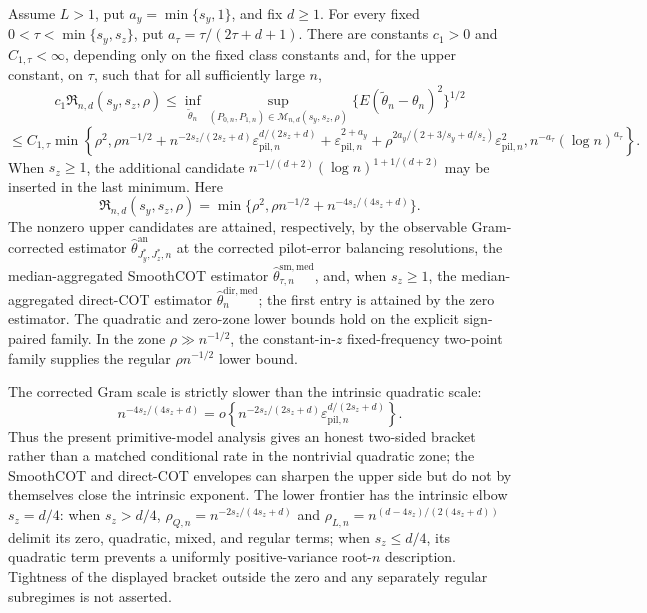 Assume \(L>1\), put \(a_y=\min\{s_y,1\}\), and fix \(d\ge1\). For every fixed \(0<\tau<\min\{s_y,s_z\}\), put \(a_\tau=\tau/(2\tau+d+1)\). There are constants \(c_1>0\) and \(C_{1,\tau}<\infty\), depending only on the fixed class constants and, for the upper constant, on \(\tau\), such that for all sufficiently large \(n\),
\[
c_1\mathfrak R_{n,d}(s_y,s_z,\rho)\le\inf_{\widetilde\theta_n}\sup_{(P_{0,n},P_{1,n})\in\mathcal M_{n,d}(s_y,s_z,\rho)}\{E(\widetilde\theta_n-\theta_n)^2\}^{1/2}
\]
\[
\le C_{1,\tau}\min\!\left\{
\rho^2,
\rho n^{-1/2}
+n^{-2s_z/(2s_z+d)}\varepsilon_{\mathrm{pil},n}^{d/(2s_z+d)}
+\varepsilon_{\mathrm{pil},n}^{2+a_y}
+\rho^{2a_y/(2+3/s_y+d/s_z)}\varepsilon_{\mathrm{pil},n}^2,
n^{-a_\tau}(\log n)^{a_\tau}
\right\}.
\]
When \(s_z\ge1\), the additional candidate \(n^{-1/(d+2)}(\log n)^{1+1/(d+2)}\) may be inserted in the last minimum. Here
\[
\mathfrak R_{n,d}(s_y,s_z,\rho)=\min\{\rho^2,\rho n^{-1/2}+n^{-4s_z/(4s_z+d)}\}.
\]
The nonzero upper candidates are attained, respectively, by the observable Gram-corrected estimator \(\widehat\theta^{\mathrm{an}}_{J_y^*,J_z^*,n}\) at the corrected pilot-error balancing resolutions, the median-aggregated SmoothCOT estimator \(\widehat\theta^{\mathrm{sm,med}}_{\tau,n}\), and, when \(s_z\ge1\), the median-aggregated direct-COT estimator \(\widehat\theta_n^{\mathrm{dir,med}}\); the first entry is attained by the zero estimator. The quadratic and zero-zone lower bounds hold on the explicit sign-paired family. In the zone \(\rho\gg n^{-1/2}\), the constant-in-\(z\) fixed-frequency two-point family supplies the regular \(\rho n^{-1/2}\) lower bound.

The corrected Gram scale is strictly slower than the intrinsic quadratic scale:
\[
n^{-4s_z/(4s_z+d)}
=o\!\left\{n^{-2s_z/(2s_z+d)}
\varepsilon_{\mathrm{pil},n}^{d/(2s_z+d)}\right\}.
\]
Thus the present primitive-model analysis gives an honest two-sided bracket rather than a matched conditional rate in the nontrivial quadratic zone; the SmoothCOT and direct-COT envelopes can sharpen the upper side but do not by themselves close the intrinsic exponent.  The lower frontier has the intrinsic elbow \(s_z=d/4\): when \(s_z>d/4\), \(\rho_{Q,n}=n^{-2s_z/(4s_z+d)}\) and \(\rho_{L,n}=n^{(d-4s_z)/(2(4s_z+d))}\) delimit its zero, quadratic, mixed, and regular terms; when \(s_z\le d/4\), its quadratic term prevents a uniformly positive-variance root-\(n\) description. Tightness of the displayed bracket outside the zero and any separately regular subregimes is not asserted.